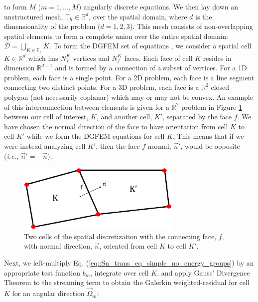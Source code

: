 \noindent to form $M$ ($m=1,...,M$) angularly discrete equations. We then lay down an unstructured mesh, $\mathbb{T}_h \in \mathbb{R}^{d}$, over the spatial domain, where $d$ is the dimensionality of the problem ($d=1,2,3$). This mesh consists of non-overlapping spatial elements to form a complete union over the entire spatial domain: $\mathcal{D} = \bigcup_{K \in \mathbb{T}_h} K$. To form the DGFEM set of equations \cite{ern2013theory,wareing2001discontinuous}, we consider a spatial cell $K \in \mathbb{R}^d$ which has $N_V^K$ vertices and $N_f^K$ faces. Each face of cell $K$ resides in dimension $\mathbb{R}^{d-1}$ and is formed by a connection of a subset of vertices. For a 1D problem, each face is a single point. For a 2D problem, each face is a line segment connecting two distinct points. For a 3D problem, each face is a $\mathbb{R}^2$ closed polygon (not necessarily coplanar) which may or may not be convex. An example of this interconnection between elements is given for a $\mathbb{R}^2$ problem in Figure \ref{fig::Sn_two_ref_cells} between our cell of interest, $K$, and another cell, $K'$, separated by the face $f$. We have chosen the normal direction of the face to have orientation from cell $K$ to cell $K'$ while we form the DGFEM equations for cell $K$. This means that if we were instead analyzing cell $K'$, then the face $f$ normal, $\vec{n}' $, would be opposite ({\em i.e.,} $\vec{n}' = -\vec{n}$).

\begin{figure}
\centering
\includegraphics[width=0.7\textwidth]{figures/sec_Sn/two_cells_Rev1.eps}
\caption[Two cells of the spatial discretization]{Two cells of the spatial discretization with the connecting face, $f$, with normal direction, $\vec{n}$, oriented from cell $K$ to cell $K'$.}
\label{fig::Sn_two_ref_cells}
\end{figure}

Next, we left-multiply Eq. (\ref{eq::Sn_trans_eq_simple_no_energy_groups}) by an appropriate test function $b_m$, integrate over cell $K$, and apply Gauss' Divergence Theorem to the streaming term to obtain the Galerkin weighted-residual for cell $K$ for an angular direction $\vec{\Omega}_m$:

